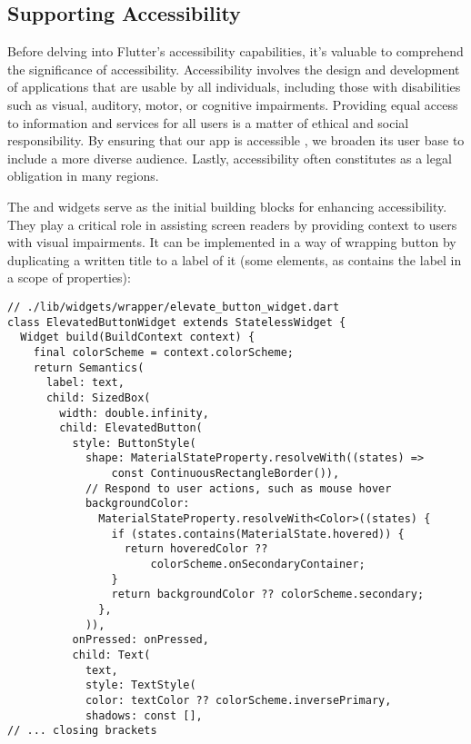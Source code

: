 
\subsection{Supporting Accessibility}

Before delving into Flutter's accessibility capabilities, it's valuable to comprehend the significance of accessibility. 
Accessibility involves the design and development of applications that are usable by all individuals, including those 
with disabilities such as visual, auditory, motor, or cognitive impairments. Providing equal access to information 
and services for all users is a matter of ethical and social responsibility. By ensuring that our app is 
accessible , we broaden its user base to include a more diverse audience. Lastly, accessibility often 
constitutes as a legal obligation in many regions.

The  and  widgets serve as the initial building blocks for enhancing accessibility. They play a 
critical role in assisting screen readers by providing context to users with visual impairments. It can be implemented 
in a way of wrapping button by duplicating a written title to a label of it (some elements, as  
contains the label in a scope of properties):

\begin{lstlisting}
// ./lib/widgets/wrapper/elevate_button_widget.dart
class ElevatedButtonWidget extends StatelessWidget {
  Widget build(BuildContext context) {
    final colorScheme = context.colorScheme;
    return Semantics(
      label: text,
      child: SizedBox(
        width: double.infinity,
        child: ElevatedButton(
          style: ButtonStyle(
            shape: MaterialStateProperty.resolveWith((states) => 
                const ContinuousRectangleBorder()),
            // Respond to user actions, such as mouse hover
            backgroundColor: 
              MaterialStateProperty.resolveWith<Color>((states) {
                if (states.contains(MaterialState.hovered)) {
                  return hoveredColor ?? 
                      colorScheme.onSecondaryContainer;
                }
                return backgroundColor ?? colorScheme.secondary;
              },
            )),
          onPressed: onPressed,
          child: Text(
            text,
            style: TextStyle(
            color: textColor ?? colorScheme.inversePrimary,
            shadows: const [],
// ... closing brackets
\end{lstlisting}

